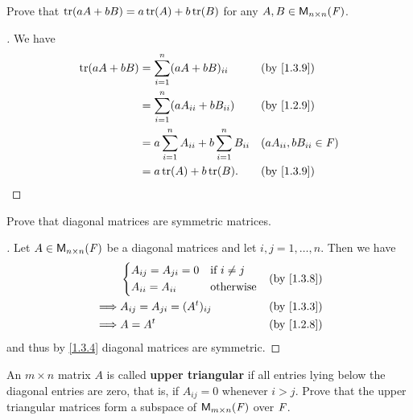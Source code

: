 \begin{ex}\label{ex:1.3.6}
  Prove that \(\tr{aA + bB} = a\tr{A} + b\tr{B}\) for any \(A, B \in \mathsf{M}_{{n} \times n}({\mathit{F}})\).
\end{ex}

\begin{proof}[]
  We have
  \begin{align*}
    \tr{aA + bB} & = \sum_{i = 1}^n (aA + bB)_{i i}                      &  & \text{(by \cref{1.3.9})}    \\
                 & = \sum_{i = 1}^n (aA_{i i} + bB_{i i})                &  & \text{(by \cref{1.2.9})}    \\
                 & = a \sum_{i = 1}^n A_{i i} + b \sum_{i = 1}^n B_{i i} &  & (aA_{i i}, bB_{i i} \in \F) \\
                 & = a\tr{A} + b\tr{B}.                                  &  & \text{(by \cref{1.3.9})}
  \end{align*}
\end{proof}

\begin{ex}\label{ex:1.3.7}
  Prove that diagonal matrices are symmetric matrices.
\end{ex}

\begin{proof}[]
  Let \(A \in \mathsf{M}_{{n} \times n}({\mathit{F}})\) be a diagonal matrices and let \(i, j = 1, \dots, n\).
  Then we have
  \begin{align*}
             & \begin{dcases}
      A_{i j} = A_{j i} = 0 & \text{if } i \neq j \\
      A_{i i} = A_{i i}     & \text{otherwise}
    \end{dcases}         &  & \text{(by \cref{1.3.8})} \\
    \implies & A_{i j} = A_{j i} = (\tp{A})_{i j} &  & \text{(by \cref{1.3.3})} \\
    \implies & A = \tp{A}                         &  & \text{(by \cref{1.2.8})}
  \end{align*}
  and thus by \cref{1.3.4} diagonal matrices are symmetric.
\end{proof}

\setcounter{ex}{11}
\begin{ex}\label{ex:1.3.12}
  An \(m \times n\) matrix \(A\) is called \textbf{upper triangular} if all entries lying below the diagonal entries are zero, that is, if \(A_{i j} = 0\) whenever \(i > j\).
  Prove that the upper triangular matrices form a subspace of \(\mathsf{M}_{{m} \times n}({\mathit{F}})\) over \(\mathit{F}\).
\end{ex}

